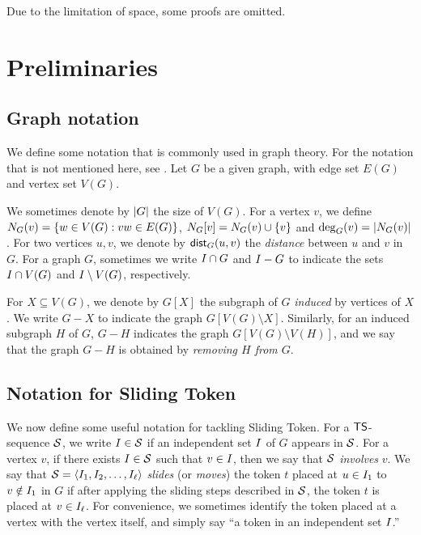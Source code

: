 \documentclass[a4paper]{llncs}
\begin{document}
Due to the limitation of space, some proofs are omitted.

\section{Preliminaries}
\label{sec:preliminaries}

\subsection*{Graph notation}
\label{sec:graph-notation}

We define some notation that is commonly used in graph theory.
For the notation that is not mentioned here, see \cite{Diestel2010}.
Let $G$ be a given graph, with edge set $E(G)$ and vertex set $V(G)$.

We sometimes denote by ${\left|G\right|}$ the size of $V(G)$.
For a vertex $v$, we define $N_{G}(v) = \{w \in V(G): vw \in E(G)\}$, $N_{G}[v] = N_{G}(v) \cup \{v\}$ and $\deg_G(v) = |N_{G}(v)|$. 
For two vertices $u, v$, we denote by $\mathsf{dist}_G(u, v)$ the \emph{distance} between $u$ and $v$ in $G$.
For a graph $G$, sometimes we write $I \cap G$ and $I - G$ to indicate the sets $I \cap V(G)$ and $I \setminus V(G)$, respectively.

For $X \subseteq V(G)$, we denote by $G[X]$ the subgraph of $G$ \emph{induced} by vertices of $X$.
We write $G - X$ to indicate the graph $G[V(G) \setminus X]$.
Similarly, for an induced subgraph $H$ of $G$, $G - H$ indicates the graph $G[V(G) \setminus V(H)]$, 
	and we say that the graph $G - H$ is obtained by \emph{removing $H$ from $G$}.

\subsection*{Notation for {\sc Sliding Token}}
\label{sec:TS-notation}

We now define some useful notation for tackling {\sc Sliding Token}. 
For a ${\sf TS}$-sequence ${\cal S}$, we write $I \in {\cal S}$ if an independent set $I$ of $G$ appears in ${\cal S}$. 
For a vertex $v$, if there exists $I \in {\cal S}$ such that $v \in I$, then we say that ${\cal S}$ \emph{involves} $v$.
We say that ${\cal S} = \langle I_1, I_2, \ldots, I_{\ell} \rangle$  \emph{slides} (or \emph{moves}) the token $t$ placed at $u \in I_1$ to $v \notin I_1$ in $G$ if after applying the sliding steps described in ${\cal S}$, the token $t$ is placed at $v \in I_\ell$.
For convenience, we sometimes identify the token placed at a vertex with the vertex itself, and simply say ``a token in an independent set $I$.''
\end{document}
